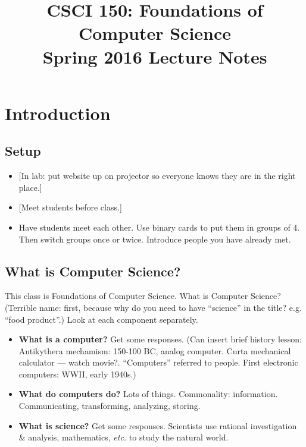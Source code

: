 \documentclass{article}
\newcommand{\etc}{\emph{etc.}\xspace}
\begin{document}
\title{CSCI 150: Foundations of Computer Science \\ Spring 2016 Lecture Notes}

\maketitle

\section{Introduction}

\subsection*{Setup}

\begin{itemize}
\item {}[In lab: put website up on projector so everyone knows they are
  in the right place.]
\item {}[Meet students before class.]
\item Have students meet each other. Use binary cards to put them in
  groups of 4.  Then switch groups once or twice.  Introduce people
  you have already met.
\end{itemize}

\subsection*{What is Computer Science?}

This class is Foundations of Computer Science.  What is Computer
Science?  (Terrible name: first, because why do you need to have
``science'' in the title?  e.g. ``food product''.)  Look at each
component separately.
\begin{itemize}
\item \textbf{What is a computer?}  Get some responses.  (Can insert
  brief history lesson: Antikythera mechamism: 150-100 BC, analog
  computer.  Curta mechanical calculator --- watch
  movie?. ``Computers'' referred to people.  First electronic
  computers: WWII, early 1940s.)
\item \textbf{What do computers do?}  Lots of things.  Commonality:
  information.  Communicating, transforming, analyzing, storing.
\item \textbf{What is science?}  Get some responses.  Scientists use
  rational investigation \& analysis, mathematics, \etc to study the
  natural world.
\end{itemize}
\end{document}
